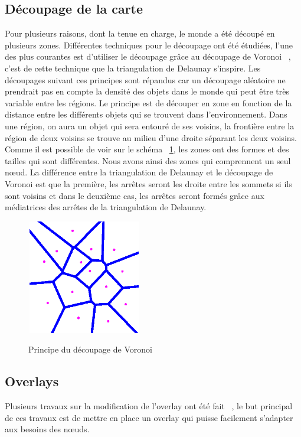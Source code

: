 	\subsection{Découpage de la carte}
	Pour plusieurs raisons, dont la tenue en charge, le monde a été découpé en plusieurs zones. Différentes techniques pour le découpage ont été étudiées, l'une des plus courantes est d'utiliser le découpage grâce au découpage de Voronoi ~\cite{1016552}, c'est de cette technique que la triangulation de Delaunay s'inspire. Les découpages suivant ces principes sont répandus car un découpage aléatoire ne prendrait pas en compte la densité des objets dans le monde qui peut être très variable entre les régions. Le principe est de découper en zone en fonction de la distance entre les différents objets qui se trouvent dans l'environnement. Dans une région, on aura un objet qui sera entouré de ses voisins, la frontière entre la région de deux voisins se trouve au milieu d'une droite séparant les deux voisins. Comme il est possible de voir sur le schéma ~\ref{Voronoi}, les zones ont des formes et des tailles qui sont différentes. Nous avons ainsi des zones qui comprennent un seul nœud. La différence entre la triangulation de Delaunay et le découpage de Voronoi est que la première, les arrêtes seront les droite entre les sommets si ils sont voisins et dans le deuxième cas, les arrêtes seront formés grâce aux médiatrices des arrêtes de la triangulation de Delaunay.\\ 
	\vspace{5mm}
        \begin{figure}[!h]
        \centering
        \includegraphics[width=5cm,height=5cm]{../Images/voronoi.png}\\
        \caption{Principe du découpage de Voronoi}
        \label{Voronoi}
        \end{figure}
        \vspace{5mm}

	\subsection{Overlays}
	Plusieurs travaux sur la modification de l'overlay ont été fait ~\cite{999375,10.1109/SRDS.2006.33,citeulike:6040284}, le but principal de ces travaux est de mettre en place un overlay qui puisse facilement s'adapter aux besoins des nœuds.
